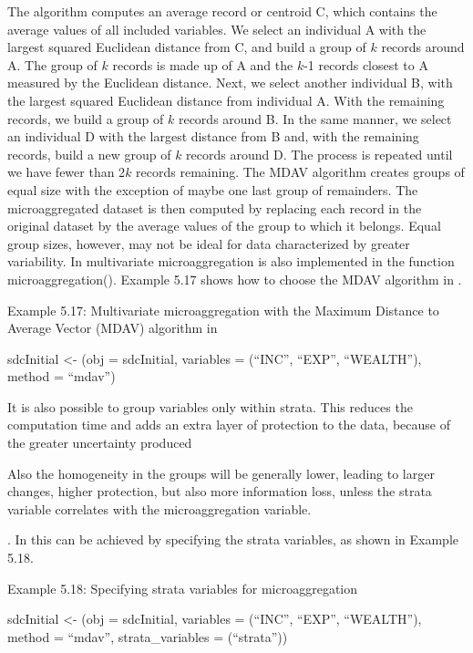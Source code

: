 \documentclass[letterpaper,10pt,english]{sphinxmanual}
\begin{document}
The algorithm computes an average record or centroid C, which contains
the average values of all included variables. We select an individual A
with the largest squared Euclidean distance from C, and build a group of
\(k\) records around A. The group of \(k\) records is made up of
A and the \(k\)-1 records closest to A measured by the Euclidean
distance. Next, we select another individual B, with the largest squared
Euclidean distance from individual A. With the remaining records, we
build a group of \(k\) records around B. In the same manner, we
select an individual D with the largest distance from B and, with the
remaining records, build a new group of \(k\) records around D. The
process is repeated until we have fewer than 2\(k\) records
remaining. The MDAV algorithm creates groups of equal size with the
exception of maybe one last group of remainders. The microaggregated
dataset is then computed by replacing each record in the original
dataset by the average values of the group to which it belongs. Equal
group sizes, however, may not be ideal for data characterized by greater
variability. In  multivariate microaggregation is also
implemented in the function microaggregation(). Example 5.17 shows how
to choose the MDAV algorithm in .

Example 5.17: Multivariate microaggregation with the Maximum Distance to
Average Vector (MDAV) algorithm in 

sdcInitial \textless{}- (obj = sdcInitial, variables =
(“INC”, “EXP”, “WEALTH”), method = “mdav”)

It is also possible to group variables only within strata. This reduces
the computation time and adds an extra layer of protection to the data,
because of the greater uncertainty produced %
\begin{footnote}[17]\sphinxAtStartFootnote
Also the homogeneity in the groups will be generally lower, leading
to larger changes, higher protection, but also more information loss,
unless the strata variable correlates with the microaggregation
variable.
%
\end{footnote}. In
 this can be achieved by specifying the strata variables, as
shown in Example 5.18.

Example 5.18: Specifying strata variables for microaggregation

sdcInitial \textless{}- (obj = sdcInitial, variables =
(“INC”, “EXP”, “WEALTH”), method = “mdav”, strata\_variables =
(“strata”))
\end{document}
